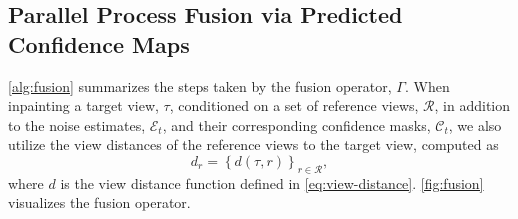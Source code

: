 \subsection{Parallel Process Fusion via Predicted Confidence Maps}
\label{supp:subsec:fusion}

\cref{alg:fusion} summarizes the steps taken by the fusion operator, $\Gamma$. When inpainting a target view, $\tau$, conditioned on a set of reference views, $\mathcal{R}$, in addition to the noise estimates, $\mathcal{E}_t$, and their corresponding confidence masks, $\mathcal{C}_t$, we also utilize the view distances of the reference views to the target view, computed as
\begin{equation}
d_r = \left\{
    d(\tau, r)
\right\}_{r \in \mathcal{R}},
\end{equation}
where $d$ is the view distance function defined in \cref{eq:view-distance}. 
\cref{fig:fusion} visualizes the fusion operator.

